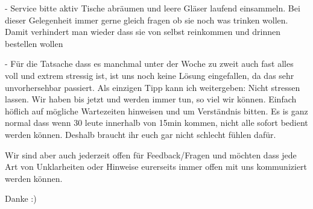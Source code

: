 - Service bitte aktiv Tische abräumen und leere Gläser laufend einsammeln. Bei dieser Gelegenheit immer gerne gleich fragen ob sie noch was trinken wollen.
    Damit verhindert man wieder dass sie von selbst reinkommen und drinnen bestellen wollen

- Für die Tatsache dass es manchmal unter der Woche zu zweit auch fast alles voll und extrem stressig ist, ist uns noch keine Lösung eingefallen, da das sehr unvorhersehbar passiert.
    Als einzigen Tipp kann ich weitergeben: Nicht stressen lassen. Wir haben bis jetzt und werden immer tun, so viel wir können. Einfach höflich auf mögliche Wartezeiten hinweisen und um Verständnis bitten. Es is ganz normal dass wenn 30 leute innerhalb von 15min kommen, nicht alle sofort bedient werden können. Deshalb braucht ihr euch gar nicht schlecht fühlen dafür.
    
Wir sind aber auch jederzeit offen für Feedback/Fragen und möchten dass jede Art von Unklarheiten oder Hinweise eurerseits immer offen mit uns kommuniziert werden können. 

Danke :)